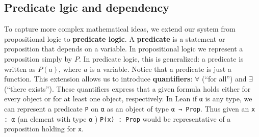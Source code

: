 \subsection{Predicate lgic and dependency}
To capture more complex mathematical ideas, we extend our system from 
propositional logic to \textbf{predicate logic}.  
A \textbf{predicate} is a statement or proposition that depends on a variable.
In propositional logic we represent a proposition simply by $P$.  
In predicate logic, this is generalized: a predicate is written as $P(a)$, 
where $a$ is a variable. Notice that a predicate is just a function.
This extension allows us to introduce \textbf{quantifiers}:  
$\forall$ (``for all'') and $\exists$ (``there exists'').  
These quantifiers express that a given formula holds either for every object 
or for at least one object, respectively.
In Lean if \lstinline[language=lean]|α| is any type, we can represent a 
predicate \lstinline[language=lean]|P| on \lstinline[language=lean]|α| as 
an object of type \lstinline[language=lean]|α → Prop|.
Thus given an \lstinline[language=lean]|x : α| (an element
with type \lstinline[language=lean]|α| ) 
\lstinline[language=lean]|P(x) : Prop| would be representative of a proposition 
holding for \lstinline[language=lean]|x|.

